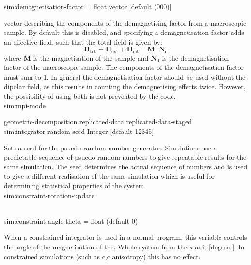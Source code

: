 {\zicf sim:demagnetisation-factor = float vector [default (000)]} vector describing the components of the demagnetising factor from a macroscopic sample. By default this is disabled, and specifying a demagnetisation factor adds an effective field, such that the total field is given by:
\begin{equation*}
\mathbf{H}_{\mathrm{tot}} = \mathbf{H}_{\mathrm{ext}} + \mathbf{H}_{\mathrm{int}} - \mathbf{M} \cdot \mathbf{N}_{\mathrm{d}}
\end{equation*}
where $\mathbf{M}$ is the magnetisation of the sample and $\mathbf{N}_{\mathrm{d}}
$ is the demagnetisation factor of the macroscopic sample. The components of the demagnetisation factor must sum to 1. In general the demagnetisation factor should be used without the dipolar field, as this results in counting the demagnetising effects twice. However, the possibility of using both is not prevented by the code.\\

{\zicf sim:mpi-mode}
    geometric-decomposition
    replicated-data
    replicated-data-staged\\


{\zicf sim:integrator-random-seed
    Integer [default 12345]}
    Sets a seed for the psuedo random number generator. Simulations use a predictable sequence of psuedo random numbers to give repeatable results for the same simulation. The seed determines the actual sequence of numbers and is used to give a different realisation of the same simulation which is useful for determining statistical properties of the system.\\

{\zicf sim:constraint-rotation-update}\\

{\zicf sim:constraint-angle-theta = float (default 0)}
    When a constrained integrator is used in a normal program, this variable controls the angle of the magnetisation of the. Whole system from the x-axis [degrees]. In constrained simulations (such as c,c anisotropy) this has no effect.\\

